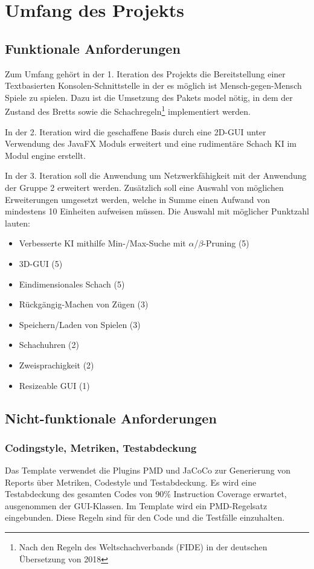 \documentclass{scrreprt}
\begin{document}
\chapter{Umfang des Projekts}
\section{Funktionale Anforderungen}
Zum Umfang gehört in der 1. Iteration des Projekts die Bereitstellung einer Textbasierten Konsolen-Schnittstelle in der es möglich ist Mensch-gegen-Mensch Spiele zu spielen. Dazu ist die Umsetzung des Pakets model nötig, in dem der Zustand des Bretts sowie die Schachregeln\footnote{Nach den Regeln des Weltschachverbands (FIDE) in der deutschen Übersetzung von 2018} implementiert werden.

In der 2. Iteration wird die geschaffene Basis durch eine 2D-GUI unter Verwendung des JavaFX Moduls erweitert und eine rudimentäre Schach KI im Modul engine erstellt.

In der 3. Iteration soll die Anwendung um Netzwerkfähigkeit mit der Anwendung der Gruppe 2 erweitert werden. Zusätzlich soll eine Auswahl von möglichen Erweiterungen umgesetzt werden, welche in Summe einen Aufwand von mindestens 10 Einheiten aufweisen müssen. Die Auswahl mit möglicher Punktzahl lauten:

\begin{itemize}
\item Verbesserte KI mithilfe Min-/Max-Suche mit $\alpha$/$\beta$-Pruning (5)
\item 3D-GUI (5)
\item Eindimensionales Schach (5)
\item Rückgängig-Machen von Zügen (3)
\item Speichern/Laden von Spielen (3)
\item Schachuhren (2)
\item Zweisprachigkeit (2)
\item Resizeable GUI (1)
\end{itemize}

\section{Nicht-funktionale Anforderungen}

\subsection{Codingstyle, Metriken, Testabdeckung}
Das Template verwendet die Plugins PMD und JaCoCo zur Generierung von Reports über Metriken, Codestyle und Testabdeckung.
Es wird eine Testabdeckung des gesamten Codes von 90\% Instruction Coverage erwartet, ausgenommen der GUI-Klassen.
Im Template wird ein PMD-Regelsatz eingebunden. Diese Regeln sind für den Code und die Testfälle einzuhalten.
\end{document}
